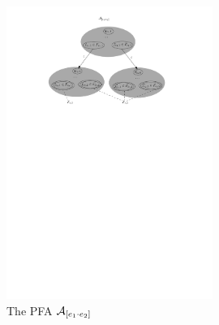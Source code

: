 		\begin{figure}[ht]
			\centering
			\includegraphics[width = 0.6\textwidth]{reg2pfa-2.pdf}
			\caption{The PFA $\mathcal{A}_{[e_1\cdot e_2]}$}
			\label{fig-reg2pfa-2}
		\end{figure}  
	


